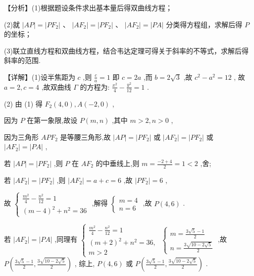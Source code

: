 \documentclass[10pt]{article}
\begin{document}
【分析】(1)根据题设条件求出基本量后得双曲线方程；

(2)就 \(\left| {AP}\right|  = \left| {P{F}_{2}}\right|\) 、 \(\left| {A{F}_{2}}\right|  = \left| {P{F}_{2}}\right|\) 、 \(\left| {A{F}_{2}}\right|  = \left| {PA}\right|\) 分类得方程组，求解后得 \(P\) 的坐标；

(3)联立直线方程和双曲线方程，结合韦达定理可得关于斜率的不等式，求解后得斜率的范围.

【详解】(1)设半焦距为 \(c\) ,则 \(\frac{c}{a} = 1\) 即 \(c = {2a}\) ,而 \(b = 2\sqrt{3}\) ,故 \({c}^{2} - {a}^{2} = {12}\) , 故 \(a = 2,c = 4\) ,故双曲线 \(\Gamma\) 的方程为: \(\frac{{x}^{2}}{4} - \frac{{y}^{2}}{12} = 1\) .

(2) 由 (1) 得 \({F}_{2}\left( {4,0}\right) ,A\left( {-2,0}\right)\) ,

因为 \(P\) 在第一象限,故设 \(P\left( {m,n}\right)\) ,其中 \(m > 2,n > 0\) ,

因为三角形 \({AP}{F}_{2}\) 是等腰三角形,故 \(\left| {AP}\right|  = \left| {P{F}_{2}}\right|\) 或 \(\left| {A{F}_{2}}\right|  = \left| {P{F}_{2}}\right|\) 或 \(\left| {A{F}_{2}}\right|  = \left| {PA}\right|\) ,

若 \(\left| {AP}\right|  = \left| {P{F}_{2}}\right|\) ,则 \(P\) 在 \(A{F}_{2}\) 的中垂线上,则 \(m = \frac{-2 + 4}{2} = 1 < 2\) ,舍;

若 \(\left| {A{F}_{2}}\right|  = \left| {P{F}_{2}}\right|\) ,则 \(\left| {A{F}_{2}}\right|  = a + c = 6\) ,故 \(\left| {P{F}_{2}}\right|  = 6\) ,

故 \(\left\{  \begin{array}{l} \frac{{m}^{2}}{4} - \frac{{n}^{2}}{12} = 1 \\  {\left( m - 4\right) }^{2} + {n}^{2} = {36} \end{array}\right.\) ,解得 \(\left\{  \begin{array}{l} m = 4 \\  n = 6 \end{array}\right.\) ,故 \(P\left( {4,6}\right)\) .

若 \(\left| {A{F}_{2}}\right|  = \left| {PA}\right|\) ,同理有 \(\left\{  \begin{array}{l} \frac{{m}^{2}}{4} - \frac{{n}^{2}}{12} = 1 \\  {\left( m + 2\right) }^{2} + {n}^{2} = {36}, \\  m > 2 \end{array}\right. \;\left\{  \begin{array}{l} m = \frac{3\sqrt{5} - 1}{2} \\  n = \frac{3\sqrt{{10} - 2\sqrt{5}}}{2} \end{array}\right.\) ,故 \(P\left( {\frac{3\sqrt{5} - 1}{2},\frac{3\sqrt{{10} - 2\sqrt{5}}}{2}}\right)\) , 综上, \(P\left( {4,6}\right)\) 或 \(P\left( {\frac{3\sqrt{5} - 1}{2},\frac{3\sqrt{{10} - 2\sqrt{5}}}{2}}\right)\) .
\end{document}
